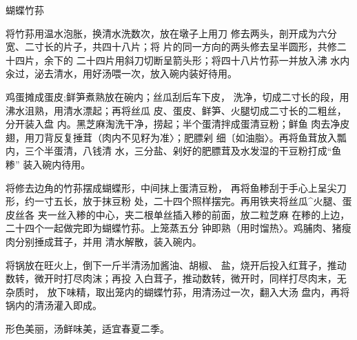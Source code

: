 \begin{recipe}{蝴蝶竹荪}

\ingredients



\cooking

\step 	将竹荪用温水泡胀，换清水洗数次，放在墩子上用刀 修去两头，剖开成为六分宽、二寸长的片子，共四十八片；将 片的同一方向的两头修去呈半圆形，共修二十四片，余下的 二十四片用斜刀切断呈箭头形；将四十八片竹荪一并放入沸 水内汆过，泌去清水，用好汤喂一次，放入碗内装好待用。

\step 	鸡蛋摊成蛋皮;鲜笋煮熟放在碗内；丝瓜刮后车下皮， 洗净，切成二寸长的段，用沸水沮熟，用清水漂起；再将丝瓜 皮、蛋皮、鲜笋、火腿切成二寸长的二粗丝，分开装入盘 内。黑芝麻淘洗干净，捞起；半个蛋清拌成蛋清豆粉；鲜鱼 肉去净皮翅，用刀背反复捶茸（肉内不见籽为准〉；肥膘剁 细〔如油脂〉。再将鱼茸放入瓢内，三个半蛋清，八钱清 水，三分盐、剁好的肥膘茸及水发湿的干豆粉打成“鱼糁” 装入碗内待用。

\step 	将修去边角的竹荪摆成蝴蝶形，中间抹上蛋清豆粉， 再将鱼糁刮于手心上呈尖刀形，约一寸五长，放于抹豆粉 处，二十四个照样摆完。再用铁夹将丝瓜^火腿、蛋皮丝各 夹一丝入糁的中心，夹二根单丝插入糁的前面，放二粒芝麻 在糁的上边，二十四个一起做完即为蝴蝶竹荪。上笼蒸五分 钟即熟（用时馏热〉。鸡脯肉、猪瘦肉分别捶成茸子，并用 清水解散，装入碗内。

\step 将锅放在旺火上，倒下一斤半清汤加酱油、胡椒、 盐，烧开后投入红茸子，推动数转，微开时打尽肉沫；再投 入白茸子，推动数转，微开时，同样打尽肉末，无杂质时， 放下味精，取出笼内的蝴蝶竹荪，用清汤过一次，翻入大汤 盘内，再将锅内的清汤灌入即成。

\notes

形色美丽，汤鲜味美，适宜春夏二季。

\end{recipe}

